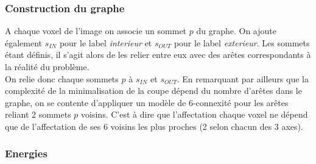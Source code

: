 \documentclass{article}
\begin{document}
\subsubsection{Construction du graphe}

A chaque voxel de l'image on associe un sommet $p$ du graphe. On ajoute également $s_{IN}$ pour le label \textit{interieur} et $s_{OUT}$ pour le label \textit{exterieur}. Les sommets étant définis, il s'agit alors de les relier entre eux avec des arêtes correspondants à la réalité du problème.\\
On relie donc chaque sommets $p$ à $s_{IN}$ et $s_{OUT}$. En remarquant par ailleurs que la complexité de la minimalisation de la coupe dépend du nombre d'arêtes dans le graphe, on se contente d'appliquer un modèle de 6-connexité pour les arêtes reliant 2 sommets $p$ voisins. C'est à dire que l'affectation chaque voxel ne dépend que de l'affectation de ses 6 voisins les plus proches (2 selon chacun des 3 axes).

\subsubsection{Energies}
\end{document}
